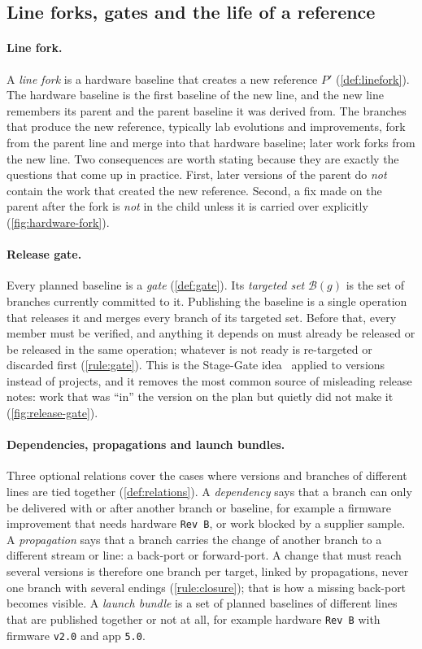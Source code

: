 \subsection{Line forks, gates and the life of a reference}
\label{sec:model-forks}

\paragraph{Line fork.}
A \emph{line fork} is a hardware baseline that creates a new reference
$P'$ (\cref{def:linefork}). The hardware baseline is the first baseline of
the new line, and the new line remembers its parent and the parent
baseline it was derived from. The branches that produce the new reference,
typically lab evolutions and improvements, fork from the parent line and
merge into that hardware baseline; later work forks from the new line.
Two consequences are worth stating because they are exactly the questions
that come up in practice. First, later versions of the parent do
\emph{not} contain the work that created the new reference. Second, a fix
made on the parent after the fork is \emph{not} in the child unless it is
carried over explicitly (\cref{fig:hardware-fork}).

\paragraph{Release gate.}
Every planned baseline is a \emph{gate} (\cref{def:gate}). Its
\emph{targeted set} $\mathcal{B}(g)$ is the set of branches currently
committed to it. Publishing the baseline is a single operation that
releases it and merges every branch of its targeted set. Before that,
every member must be verified, and anything it depends on must already be
released or be released in the same operation; whatever is not ready is
re-targeted or discarded first (\cref{rule:gate}). This is the
Stage-Gate idea~\citep{cooper1990stagegate} applied to versions instead of
projects, and it removes the most common source of misleading release
notes: work that was ``in'' the version on the plan but quietly did not
make it (\cref{fig:release-gate}).

\paragraph{Dependencies, propagations and launch bundles.}
Three optional relations cover the cases where versions and branches of
different lines are tied together (\cref{def:relations}). A
\emph{dependency} says that a branch can only be delivered with or after
another branch or baseline, for example a firmware improvement that needs
hardware \texttt{Rev~B}, or work blocked by a supplier sample. A
\emph{propagation} says that a branch carries the change of another branch
to a different stream or line: a back-port or forward-port. A change that
must reach several versions is therefore one branch per target, linked by
propagations, never one branch with several endings (\cref{rule:closure});
that is how a missing back-port becomes visible. A \emph{launch bundle}
is a set of planned baselines of different lines that are published
together or not at all, for example hardware \texttt{Rev~B} with firmware
\texttt{v2.0} and app \texttt{5.0}.

